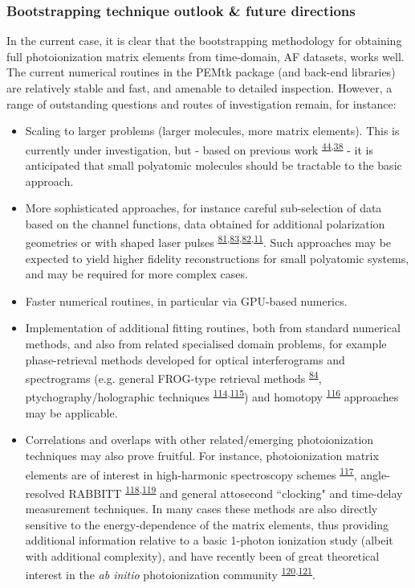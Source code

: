 \documentclass[10pt]{article}
\begin{document}
\subsubsection{Bootstrapping technique outlook \& future directions}

In the current case, it is clear that the bootstrapping methodology for obtaining full photoionization matrix elements from time-domain, AF datasets, works well. The current numerical routines in the PEMtk package (and back-end libraries) are relatively stable and fast, and amenable to detailed inspection. However, a range of outstanding questions and routes of investigation remain, for instance:

\begin{itemize}
\item Scaling to larger problems (larger molecules, more matrix elements). This is currently under investigation, but - based on previous work \textsuperscript{\hyperref[csl:44]{44},\hyperref[csl:38]{38}} - it is anticipated that small polyatomic molecules should be tractable to the basic approach. 
\item More sophisticated approaches, for instance careful sub-selection of data based on the channel functions, data obtained for additional polarization geometries or with shaped laser pulses \textsuperscript{\hyperref[csl:81]{81},\hyperref[csl:83]{83},\hyperref[csl:82]{82},\hyperref[csl:11]{11}}. Such approaches may be expected to yield higher fidelity reconstructions for small polyatomic systems, and may be required for more complex cases.
\item Faster numerical routines, in particular via GPU-based numerics.
\item Implementation of additional fitting routines, both from standard numerical methods, and also from related specialised domain problems, for example phase-retrieval methods developed for optical interferograms and spectrograms (e.g. general FROG-type retrieval methods \textsuperscript{\hyperref[csl:84]{84}}, ptychography/holographic techniques \textsuperscript{\hyperref[csl:114]{114},\hyperref[csl:115]{115}}) and homotopy \textsuperscript{\hyperref[csl:116]{116}} approaches may be applicable.
\item Correlations and overlaps with other related/emerging photoionization techniques may also prove fruitful. For instance, photoionization matrix elements are of interest in high-harmonic spectroscopy schemes \textsuperscript{\hyperref[csl:117]{117}}, angle-resolved RABBITT \textsuperscript{\hyperref[csl:118]{118},\hyperref[csl:119]{119}} and general attosecond ``clocking" and time-delay measurement techniques. In many cases these methods are also directly sensitive to the energy-dependence of the matrix elements, thus providing additional information relative to a basic 1-photon ionization study (albeit with additional complexity), and have recently been of great theoretical interest in the \textit{ab initio} photoionization community \textsuperscript{\hyperref[csl:120]{120},\hyperref[csl:121]{121}}.

\end{itemize}
\end{document}
